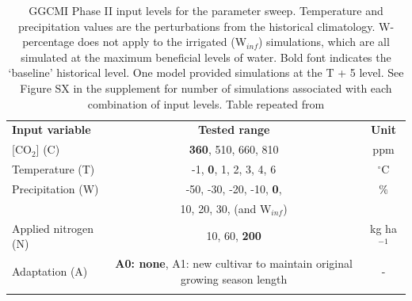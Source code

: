\documentclass[gmd, manuscript]{copernicus} %
\begin{document}
\begin{table}[t]
\caption{GGCMI Phase II input levels for the parameter sweep. 
Temperature and precipitation values are the perturbations from the historical climatology. 
W-percentage does not apply to the irrigated (W$_{inf}$) simulations, which are all simulated at the maximum beneficial levels of water. 
Bold font indicates the `baseline' historical level. One model provided simulations at the T + 5 level. 
See Figure SX in the supplement for number of simulations associated with each combination of input levels.
Table repeated from \citet{Franke2019a} 
}
\label{table:inputs} 
    \begin{tabular}{lcc} 
        \tophline \vspace{1mm}
        \textbf{Input variable} & \textbf{Tested range} & \textbf{Unit} \\ \middlehline \vspace{1mm}
        [CO$_2$] (C) & \textbf{360}, 510, 660, 810 & ppm\\ \middlehline \vspace{1mm}
        Temperature (T) & -1, \textbf{0}, 1, 2, 3, 4, 6 & $^{\circ}$C\\ \middlehline \vspace{1mm}
        Precipitation (W) & -50, -30, -20, -10, \textbf{0}, & \% \\
        {} & 10, 20, 30, (and W$_{inf}$) & {} \\ \middlehline \vspace{1mm}
        Applied nitrogen (N) & 10, 60, \textbf{200} & kg ha$^{-1}$ \\ \middlehline \vspace{1mm}
        Adaptation (A) & \textbf{A0: none}, A1: new cultivar to maintain original growing season length & -\\ \bottomhline
    \end{tabular}\\
\end{table}
\end{document}
